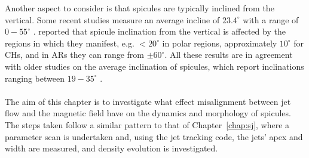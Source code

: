 \documentclass[12pt]{ociamthesis}
\newcommand{\np}{\\ \\}
\newcommand{\degs}{^{\circ}}
\begin{document}
%
Another aspect to consider is that spicules are typically inclined from the vertical. Some recent studies measure an average incline of $23.4\degs$ with a range of $0-55\degs$ \citep{Pasachoff2009SoPh26059P}. \cite{Tavabi2012JMPh31786T} reported that spicule inclination from the vertical is affected by the regions in which they manifest, e.g. $<20\degs$ in polar regions, approximately $10\degs$ for CHs, and in ARs they can range from $\pm 60\degs$. All these results are in agreement with older studies on the average inclination of spicules, which report inclinations ranging between $19-35 \degs$ \citep{Beckers1968, Mosher1977SoPh53375M, Heristchi1992SoPh14221H, Tsiropoula2012}. \np
%
The aim of this chapter is to investigate what effect misalignment between jet flow and the magnetic field have on the dynamics and morphology of spicules. The steps taken follow a similar pattern to that of Chapter~\ref{chap:sj}, where a parameter scan is undertaken and, using the jet tracking code, the jets' apex and width are measured, and density evolution is investigated. 
\end{document}
